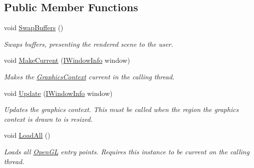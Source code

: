 \subsection*{Public Member Functions}
\begin{DoxyCompactItemize}
\item 
void \hyperlink{interface_open_t_k_1_1_graphics_1_1_i_graphics_context_ad7d516da745576542161f1baa5f20129}{Swap\-Buffers} ()
\begin{DoxyCompactList}\small\item\em Swaps buffers, presenting the rendered scene to the user.\end{DoxyCompactList}\item 
void \hyperlink{interface_open_t_k_1_1_graphics_1_1_i_graphics_context_a73a3ca64b49a682800e636d0135887ed}{Make\-Current} (\hyperlink{interface_open_t_k_1_1_platform_1_1_i_window_info}{I\-Window\-Info} window)
\begin{DoxyCompactList}\small\item\em Makes the \hyperlink{class_open_t_k_1_1_graphics_1_1_graphics_context}{Graphics\-Context} current in the calling thread.\end{DoxyCompactList}\item 
void \hyperlink{interface_open_t_k_1_1_graphics_1_1_i_graphics_context_a4bf57e48815f169c133eb15ccda2d146}{Update} (\hyperlink{interface_open_t_k_1_1_platform_1_1_i_window_info}{I\-Window\-Info} window)
\begin{DoxyCompactList}\small\item\em Updates the graphics context. This must be called when the region the graphics context is drawn to is resized. \end{DoxyCompactList}\item 
void \hyperlink{interface_open_t_k_1_1_graphics_1_1_i_graphics_context_a8f8df276eeac50ba850cb21fa5a4e676}{Load\-All} ()
\begin{DoxyCompactList}\small\item\em Loads all \hyperlink{namespace_open_t_k_1_1_graphics_1_1_open_g_l}{Open\-G\-L} entry points. Requires this instance to be current on the calling thread. \end{DoxyCompactList}\end{DoxyCompactItemize}
